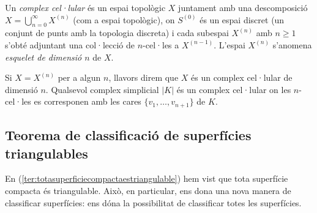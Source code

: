 \documentclass[../main.tex]{subfiles}
\begin{document}
\begin{defi}
\label{def:complexcellular} Un \textit{complex cel·lular} és un espai topològic $X$ juntament amb una descomposició $X = \bigcup_{n=0}^\infty X^{(n)}$ (com a espai topològic), on $S^{(0)}$ és un espai discret (un conjunt de punts amb la topologia discreta) i cada subespai $X^{(n)}$ amb $n\geq 1$ s'obté adjuntant una col·lecció de $n$-cel·les a $X^{(n-1)}$. L'espai $X^{(n)}$ s'anomena \textit{esquelet de dimensió $n$}\label{def:esquelet} de $X$. 
\end{defi}

Si $X = X^{(n)}$ per a algun $n$, llavors direm que $X$ és un complex cel·lular de dimensió $n$. Qualsevol complex simplicial $|K|$ és un complex cel·lular on les $n$-cel·les es corresponen amb les cares $\{v_1,\ldots,v_{n+1}\}$ de $K$.


\subsection{Teorema de classificació de superfícies triangulables}

En (\ref{ter:totasuperficiecompactaestriangulable}) hem vist que tota superfície compacta és triangulable. Això, en particular, ens dona una nova manera de classificar superfícies: ens dóna la possibilitat de classificar totes les superfícies. 
\end{document}
